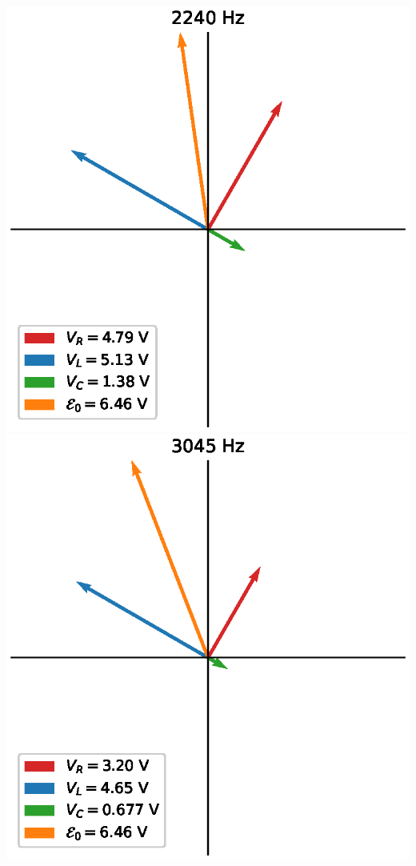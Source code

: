 \documentclass[12pt]{iopart} %
\begin{document}
\includegraphics{media/part_3_2240_hz.eps}
\includegraphics{media/part_3_3045_hz.eps}
\end{document}
